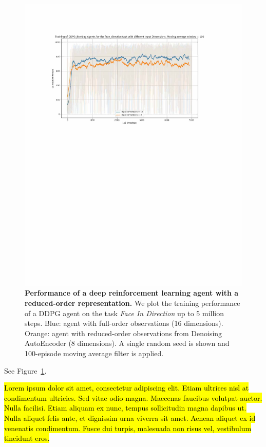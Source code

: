 \documentclass[letterpaper, 10 pt, conference]{ieeeconf}
\begin{document}
\begin{figure}[t]
    \centering
    \includegraphics[width=\linewidth]{fig-ae-perf}
    \caption{
        \textbf{Performance of a deep reinforcement learning agent with a reduced-order representation.}
        We plot the training performance of a DDPG agent on the task \textit{Face In Direction} up to 5 million steps.
        Blue: agent with full-order observations (16 dimensions).
        Orange: agent with reduced-order observations from Denoising AutoEncoder (8 dimensions).
        A single random seed is shown and 100-episode moving average filter is applied.
    }
    \label{fig:ae-perf}
\end{figure}

See Figure~\ref{fig:ae-perf}.

\hl{Lorem ipsum dolor sit amet, consectetur adipiscing elit. Etiam ultrices nisl at condimentum ultricies. Sed vitae odio magna. Maecenas faucibus volutpat auctor. Nulla facilisi. Etiam aliquam ex nunc, tempus sollicitudin magna dapibus ut. Nulla aliquet felis ante, et dignissim urna viverra sit amet. Aenean aliquet ex id venenatis condimentum. Fusce dui turpis, malesuada non risus vel, vestibulum tincidunt eros.}
\end{document}
